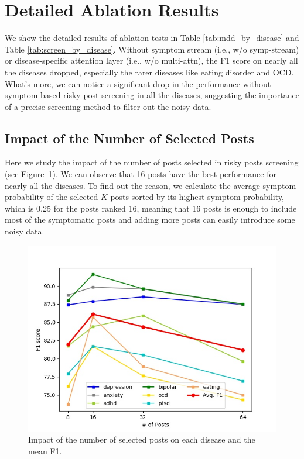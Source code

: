 \section{Detailed Ablation Results}
\label{apd:abl_results}
We show the detailed results of ablation tests in Table \ref{tab:mdd_by_disease} and Table \ref{tab:screen_by_disease}.
Without symptom stream (i.e., w/o symp-stream) or disease-specific attention layer (i.e., w/o multi-attn), the F1 score on nearly all the diseases dropped, especially the rarer diseases like eating disorder and OCD. What's more, we can notice a significant drop in the performance without symptom-based risky post screening in all the diseases, suggesting the importance of a precise screening method to filter out the noisy data.

\subsection{Impact of the Number of Selected Posts}
\label{apd:post_num}
Here we study the impact of the number of posts selected in risky posts screening (see Figure~\ref{fig:post_num}). We can observe that 16 posts have the best performance for nearly all the diseases. To find out the reason, we calculate the average symptom probability of the selected $K$ posts sorted by its highest symptom probability, which is 0.25 for the posts ranked 16, meaning that 16 posts is enough to include most of the symptomatic posts and adding more posts can easily introduce some noisy data.

\begin{figure}[th]
    \centering
    \includegraphics[width=\linewidth]{figures/post_num_impact.jpg}
    \caption{Impact of the number of selected posts on each disease and the mean F1.}
    \label{fig:post_num}
\end{figure}

